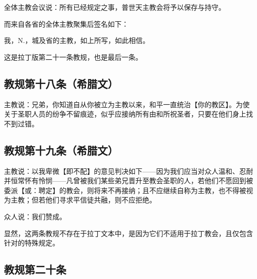 全体主教会议说：所有已经规定之事，普世天主教会将予以保存与持守。\par

而来自各省的全体主教聚集后签名如下：\par

我，N.，城及省的主教，如上所写，如此相信。\par

这是拉丁版第二十一条教规，也是最后一条。\par


\subsection{教规第十八条（希腊文）}

主教说：兄弟，你知道自从你被立为主教以来，和平一直统治【你的教区】。为使关于圣职人员的纷争不留痕迹，似乎应接纳所有由和所祝圣者，只要在他们身上找不到过错。\par


\subsection{教规第十九条（希腊文）}

主教说：以我卑微【即不配】的意见判决如下——因为我们应当对众人温和、忍耐并恒常怀有怜悯——凡曾被我们某些弟兄晋升至教会圣职的人，若他们不愿回到被委派【或：聘定】的教会，则将来不再接纳；且不应继续自称为主教，也不得被视为主教；但若他们寻求平信徒共融，则不应拒绝。\par

众人说：我们赞成。\par

显然，这两条教规不存在于拉丁文本中，是因为它们不适用于拉丁教会，且仅包含针对的特殊规定。\par


\subsection{教规第二十条}

